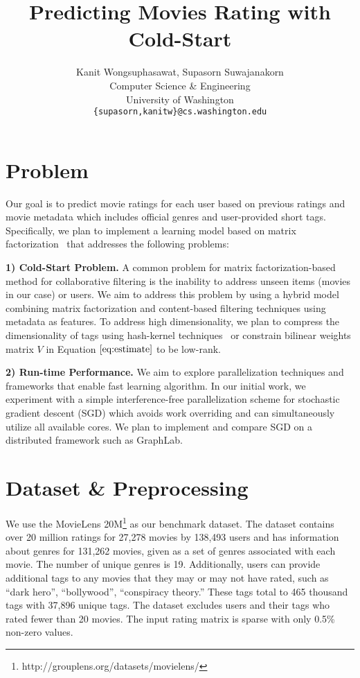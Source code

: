 \documentclass{article} %
\title{Predicting Movies Rating with Cold-Start}
\author{
	Kanit Wongsuphasawat, Supasorn Suwajanakorn \\
	Computer Science \& Engineering\\
	University of Washington\\
	\texttt{\{supasorn,kanitw\}@cs.washington.edu} \\
}
\begin{document}
	
	\maketitle
	
	\section{Problem}
	Our goal is to predict movie ratings for each user based on previous ratings and movie metadata which includes official genres and user-provided short tags.  Specifically, we plan to implement a learning model based on matrix factorization~\cite{koren:matrix} that addresses the following problems:
	
	\textbf{1) Cold-Start Problem.} A common problem for matrix factorization-based method for collaborative filtering is the inability to address unseen items (movies in our case) or users.  We aim to address this problem by using a hybrid model combining matrix factorization and content-based filtering techniques using metadata as features. To address high dimensionality, we plan to compress the dimensionality of tags using hash-kernel techniques~\cite{shi:hashkernels} or constrain bilinear weights matrix $V$ in Equation $\ref{eq:estimate}$ to be low-rank.
	
	\textbf{2) Run-time Performance.} We aim to explore parallelization techniques and frameworks that enable fast learning algorithm.  In our initial work, we experiment with a simple interference-free parallelization scheme for stochastic gradient descent (SGD) which avoids work overriding and can simultaneously utilize all available cores. We plan to implement and compare SGD on a distributed framework such as GraphLab.
	
	
	\section{Dataset \& Preprocessing}
	We use the MovieLens 20M\footnote{http://grouplens.org/datasets/movielens/}
	as our benchmark dataset.  The dataset contains over 20 million ratings for 27,278 movies by 138,493 users and has information about genres for 131,262 movies, given as a set of genres associated with each movie. The number of unique genres is 19. Additionally, users can provide additional tags to any movies that they may or may not have rated, such as ``dark hero'', ``bollywood'', ``conspiracy theory.''  These tags total to 465 thousand tags with 37,896 unique tags. The dataset excludes users  and their tags who rated fewer than 20 movies. The input rating matrix is sparse with only 0.5\% non-zero values.
	
\end{document}
